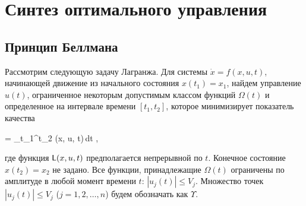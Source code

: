 


\chapter{Синтез оптимального управления}
\newcommand{\funcF}{ \calf{F}           } %
\newcommand{\optF}{  \optimum{\funcF}   } %
\newcommand{\optU}{  \optimum{u}        } %
\newcommand{\optX}{  \optimum{x}        } %
\newcommand{\funcL}{ \sff{L}            } %
\newcommand{\funcT}{ \optimum{\sff{F}}  } %
\newcommand{\funcV}{ \sff{V}            } %
\newcommand{\funcH}{ \optimum{H}        } %

\newcommand{\setS}{  \calf{S}           } %
\newcommand{\setV}{  \calf{V}           } %




\section{Принцип Беллмана}



Рассмотрим следующую задачу Лагранжа. Для системы $\dot{x} = f(x, u, t)$, начинающей движение из начального состояния $x(t_1) = x_1$, найдем управление $u(t)$, ограниченное некоторым допустимым классом функций $\Omega(t)$ и определенное на интервале времени $[t_1, t_2]$, которое минимизирует показатель качества

    \funcF = \int\limits_{t_1}^{t_2} \funcL(x, u, t)\,dt \mbox{,}
\eeq

где функция $\funcL(x, u, t)$ предполагается непрерывной по $t$. Конечное состояние $x(t_2) = x_2$ не задано. Все функции, принадлежащие $\Omega(t)$ ограничены по амплитуде в любой момент времени $t$: $|u_j(t)| \leqslant V_j$. Множество точек $|u_j(t)| \leqslant V_j$ ($j = 1, 2, \ldots, n$) будем обозначать как $\Upsilon$.

